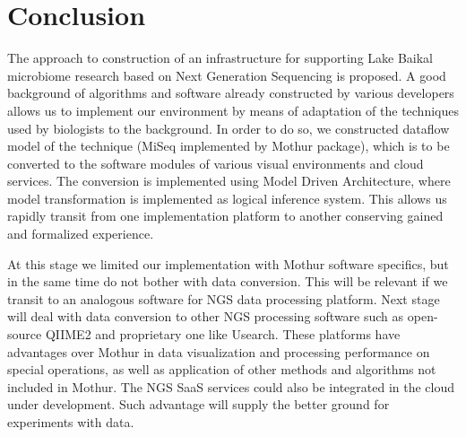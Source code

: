 \documentclass[a4paper]{jpconf}
\begin{document}











\section*{Conclusion}

The approach to construction of an infrastructure for supporting Lake Baikal microbiome research based on Next Generation Sequencing is proposed. A good background of algorithms and software already constructed by various developers allows us to implement our environment by means of adaptation of the techniques used by biologists to the background.  In order to do so, we constructed dataflow model of the technique (MiSeq implemented by Mothur package), which is to be converted to the software modules of various visual environments and cloud services.  The conversion is implemented using Model Driven Architecture, where model transformation is implemented as logical inference system. This allows us rapidly transit from one implementation platform to another conserving gained and formalized experience.

At this stage we limited our implementation with Mothur software specifics, but in the same time do not bother with data conversion.  This will be relevant if we transit to an analogous software for NGS data processing platform.  Next stage will deal with data conversion to other NGS processing software such as open-source QIIME2 and proprietary one like Usearch.  These platforms have advantages over Mothur in data visualization and processing performance on special operations, as well as application of other methods and algorithms not included in Mothur. The NGS SaaS services \cite{guo16,kwon15} could also be integrated in the cloud under development.  Such advantage will supply the better ground for experiments with data.
\end{document}
